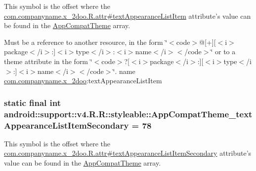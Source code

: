 This symbol is the offset where the \hyperlink{classcom_1_1companyname_1_1x__2doo_1_1_r_1_1attr_9a6f00adef5f9f8386a17232acf294af}{com.companyname.x\_\-2doo.R.attr\#textAppearanceListItem} attribute's value can be found in the \hyperlink{classandroid_1_1support_1_1v4_1_1_r_1_1styleable_0873e92ba21076bb5a4aeadeb7f5779f}{AppCompatTheme} array.

Must be a reference to another resource, in the form \char`\"{}$<$code$>$@\mbox{[}+\mbox{]}\mbox{[}$<$i$>$package$<$/i$>$:\mbox{]}$<$i$>$type$<$/i$>$:$<$i$>$name$<$/i$>$$<$/code$>$\char`\"{} or to a theme attribute in the form \char`\"{}$<$code$>$?\mbox{[}$<$i$>$package$<$/i$>$:\mbox{]}\mbox{[}$<$i$>$type$<$/i$>$:\mbox{]}$<$i$>$name$<$/i$>$$<$/code$>$\char`\"{}.  name \hyperlink{namespacecom_1_1companyname_1_1x__2doo}{com.companyname.x\_\-2doo}:textAppearanceListItem \hypertarget{classandroid_1_1support_1_1v4_1_1_r_1_1styleable_c4014b38c2c4cc12f0ebf7d747ad85fc}{
\subsubsection[{AppCompatTheme\_\-textAppearanceListItemSecondary}]{\setlength{\rightskip}{0pt plus 5cm}static final int android::support::v4.R.R::styleable::AppCompatTheme\_\-textAppearanceListItemSecondary = 78}}
\label{classandroid_1_1support_1_1v4_1_1_r_1_1styleable_c4014b38c2c4cc12f0ebf7d747ad85fc}


This symbol is the offset where the \hyperlink{classcom_1_1companyname_1_1x__2doo_1_1_r_1_1attr_a94d87aabbe8326b150f14b43dcc4e36}{com.companyname.x\_\-2doo.R.attr\#textAppearanceListItemSecondary} attribute's value can be found in the \hyperlink{classandroid_1_1support_1_1v4_1_1_r_1_1styleable_0873e92ba21076bb5a4aeadeb7f5779f}{AppCompatTheme} array.

